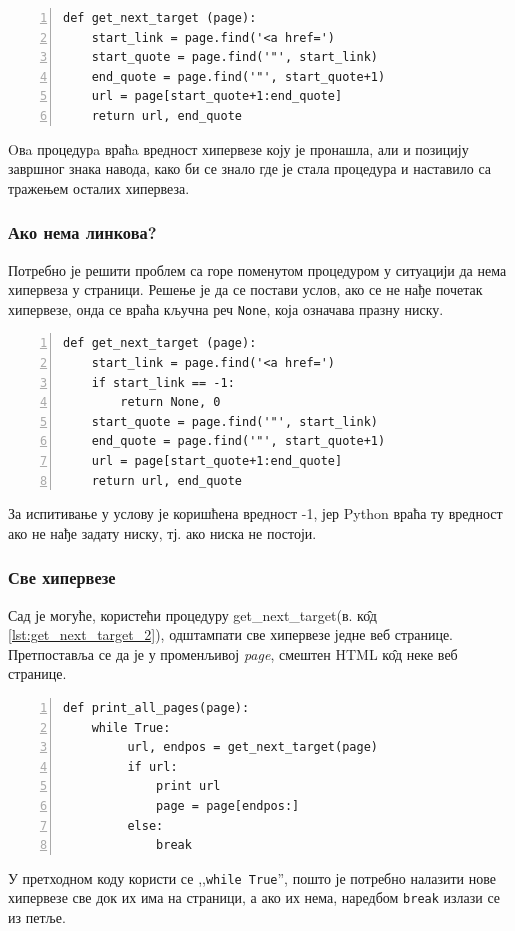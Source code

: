\begin{lstlisting}[caption= Процедура налажења прве следеће хипервезе, label={lst:get_next_target_1}, numbers = left]
def get_next_target (page):
    start_link = page.find('<a href=')
    start_quote = page.find('"', start_link)
    end_quote = page.find('"', start_quote+1)
    url = page[start_quote+1:end_quote]
    return url, end_quote
\end{lstlisting}

Oвa процедурa враћa вредност хипервезе коју је пронашла, али и позицију завршног знака навода, како би се знало где је стала процедура и наставило са тражењем осталих хипервеза.

\subsubsection{Ако нема линкова?}

Потребно је решити проблем са горе поменутом процедуром у ситуацији да нема хипервеза у страници. Решење је да се постави услов, ако се не нађе почетак хипервезе, онда се враћа кључна реч \lstinline{None}, која означава празну ниску.

\begin{lstlisting}[caption = Испитивање да ли страница садржи хипервезу, label={lst:get_next_target_2}, numbers = left]
def get_next_target (page):
    start_link = page.find('<a href=')
    if start_link == -1:
        return None, 0
    start_quote = page.find('"', start_link)
    end_quote = page.find('"', start_quote+1)
    url = page[start_quote+1:end_quote]
    return url, end_quote
\end{lstlisting}

За испитивање у услову је коришћена вредност -1, јер Python враћа ту вредност ако не нађе задату ниску, тј. ако ниска не постоји.

\subsubsection{Све хипервезе}		Сад је могуће, користећи процедуру get\_next\_target(в. к\^{о}д \ref{lst:get_next_target_2}), одштампати све хипервезе једне веб странице. Претпоставља се да је у променљивој \emph{page}, смештен HTML к\^{о}д неке веб странице.

\begin{lstlisting}[caption=Процедура штампања свих хипервеза, label={lst:print_all_links}, numbers = left	]
def print_all_pages(page):
    while True:
         url, endpos = get_next_target(page)
         if url:
             print url
             page = page[endpos:]
         else:
             break
\end{lstlisting}

У претходном коду користи се ,,\lstinline{while True}'', пошто је потребно налазити нове хипервезе све док их има на страници, а ако их нема, наредбом \lstinline{break} излази се из петље.
